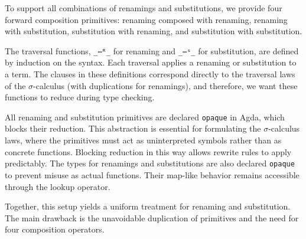 \documentclass[screen,nonacm]{acmart}
\begin{document}
To support all combinations of renamings and substitutions, we provide four
forward composition primitives: renaming composed with renaming, renaming with
substitution, substitution with renaming, and substitution with substitution.

The traversal functions, \texttt{\_⋯ᴿ\_} for renaming and \texttt{\_⋯ˢ\_} for
substitution, are defined by induction on the syntax. Each traversal applies a
renaming or substitution to a term. The clauses in these definitions correspond
directly to the traversal laws of the $\sigma$-calculus (with duplications for renamings), and therefore, we want these functions to reduce during type checking.

All renaming and substitution primitives are declared \texttt{opaque} in Agda,
which blocks their reduction. This abstraction is essential for formulating the
$\sigma$-calculus laws, where the primitives must act as uninterpreted symbols
rather than as concrete functions. Blocking reduction in this way allows
rewrite rules to apply predictably. 
The types for renamings and substitutions are also declared \texttt{opaque} to prevent misuse as actual functions. Their map-like behavior remains accessible through the lookup operator.

Together, this setup yields a uniform treatment for renaming and
substitution. The main drawback is
the unavoidable duplication of primitives and the need for four composition
operators.
\end{document}
